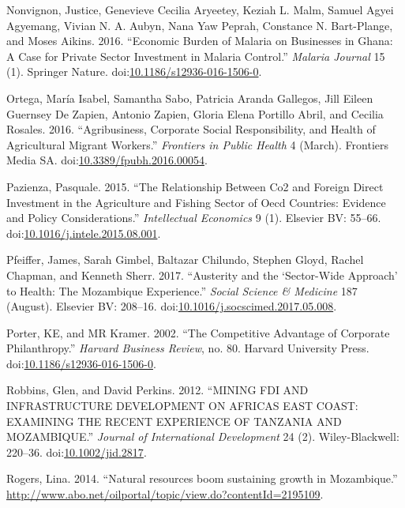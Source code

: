 \documentclass[]{article}
\begin{document}
\hypertarget{ref-Nonvignon_2016}{}
Nonvignon, Justice, Genevieve Cecilia Aryeetey, Keziah L. Malm, Samuel
Agyei Agyemang, Vivian N. A. Aubyn, Nana Yaw Peprah, Constance N.
Bart-Plange, and Moses Aikins. 2016. ``Economic Burden of Malaria on
Businesses in Ghana: A Case for Private Sector Investment in Malaria
Control.'' \emph{Malaria Journal} 15 (1). Springer Nature.
doi:\href{https://doi.org/10.1186/s12936-016-1506-0}{10.1186/s12936-016-1506-0}.

\hypertarget{ref-Ortega_2016}{}
Ortega, María Isabel, Samantha Sabo, Patricia Aranda Gallegos, Jill
Eileen Guernsey De Zapien, Antonio Zapien, Gloria Elena Portillo Abril,
and Cecilia Rosales. 2016. ``Agribusiness, Corporate Social
Responsibility, and Health of Agricultural Migrant Workers.''
\emph{Frontiers in Public Health} 4 (March). Frontiers Media SA.
doi:\href{https://doi.org/10.3389/fpubh.2016.00054}{10.3389/fpubh.2016.00054}.

\hypertarget{ref-Pazienza_2015}{}
Pazienza, Pasquale. 2015. ``The Relationship Between Co2 and Foreign
Direct Investment in the Agriculture and Fishing Sector of Oecd
Countries: Evidence and Policy Considerations.'' \emph{Intellectual
Economics} 9 (1). Elsevier BV: 55--66.
doi:\href{https://doi.org/10.1016/j.intele.2015.08.001}{10.1016/j.intele.2015.08.001}.

\hypertarget{ref-Pfeiffer_2017}{}
Pfeiffer, James, Sarah Gimbel, Baltazar Chilundo, Stephen Gloyd, Rachel
Chapman, and Kenneth Sherr. 2017. ``Austerity and the `Sector-Wide
Approach' to Health: The Mozambique Experience.'' \emph{Social Science
\& Medicine} 187 (August). Elsevier BV: 208--16.
doi:\href{https://doi.org/10.1016/j.socscimed.2017.05.008}{10.1016/j.socscimed.2017.05.008}.

\hypertarget{ref-Porter2002}{}
Porter, KE, and MR Kramer. 2002. ``The Competitive Advantage of
Corporate Philanthropy.'' \emph{Harvard Business Review}, no. 80.
Harvard University Press.
doi:\href{https://doi.org/10.1186/s12936-016-1506-0}{10.1186/s12936-016-1506-0}.

\hypertarget{ref-Robbins2012}{}
Robbins, Glen, and David Perkins. 2012. ``MINING FDI AND INFRASTRUCTURE
DEVELOPMENT ON AFRICAS EAST COAST: EXAMINING THE RECENT EXPERIENCE OF
TANZANIA AND MOZAMBIQUE.'' \emph{Journal of International Development}
24 (2). Wiley-Blackwell: 220--36.
doi:\href{https://doi.org/10.1002/jid.2817}{10.1002/jid.2817}.

\hypertarget{ref-Rogers}{}
Rogers, Lina. 2014. ``Natural resources boom sustaining growth in
Mozambique.''
\url{http://www.abo.net/oilportal/topic/view.do?contentId=2195109}.
\end{document}
